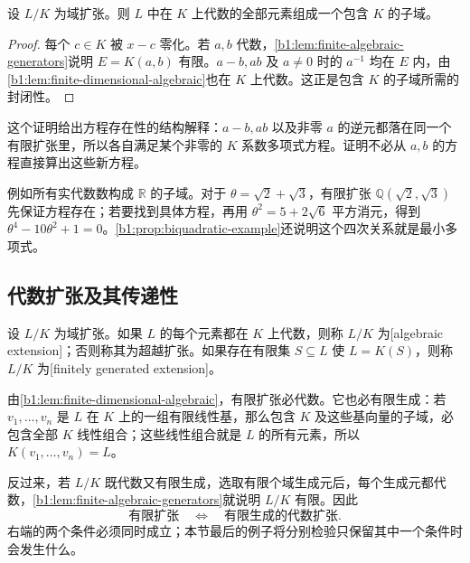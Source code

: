 \begin{proposition}\label{b1:prop:algebraic-elements-subfield}
	设 \(L/K\) 为域扩张。则 \(L\) 中在 \(K\) 上代数的全部元素组成一个包含 \(K\) 的子域。
\end{proposition}
\begin{proof}
	每个 \(c\in K\) 被 \(x-c\) 零化。若 \(a,b\) 代数，\cref{b1:lem:finite-algebraic-generators}说明 \(E=K(a,b)\) 有限。\(a-b,ab\) 及 \(a\neq0\) 时的 \(a^{-1}\) 均在 \(E\) 内，由\cref{b1:lem:finite-dimensional-algebraic}也在 \(K\) 上代数。这正是包含 \(K\) 的子域所需的封闭性。
\end{proof}
这个证明给出方程存在性的结构解释：\(a-b,ab\) 以及非零 \(a\) 的逆元都落在同一个有限扩张里，所以各自满足某个非零的 \(K\) 系数多项式方程。证明不必从 \(a,b\) 的方程直接算出这些新方程。

\ProseParagraphBreak
例如所有实代数数构成 \(\mathbb R\) 的子域。对于 \(\theta=\sqrt2+\sqrt3\)，有限扩张 \(\mathbb Q(\sqrt2,\sqrt3)\) 先保证方程存在；若要找到具体方程，再用 \(\theta^2=5+2\sqrt6\) 平方消元，得到 \(\theta^4-10\theta^2+1=0\)。\cref{b1:prop:biquadratic-example}还说明这个四次关系就是最小多项式。

\subsection{代数扩张及其传递性}
\label{b1:subsec:1402:02}

\begin{definition}\label{b1:def:algebraic-extension}
	设 \(L/K\) 为域扩张。如果 \(L\) 的每个元素都在 \(K\) 上代数，则称 \(L/K\) 为[algebraic extension]；否则称其为超越扩张。如果存在有限集 \(S\subseteq L\) 使 \(L=K(S)\)，则称 \(L/K\) 为[finitely generated extension]。
\end{definition}
由\cref{b1:lem:finite-dimensional-algebraic}，有限扩张必代数。它也必有限生成：若 \(v_1,\ldots,v_n\) 是 \(L\) 在 \(K\) 上的一组有限线性基，那么包含 \(K\) 及这些基向量的子域，必包含全部 \(K\) 线性组合；这些线性组合就是 \(L\) 的所有元素，所以 \(K(v_1,\ldots,v_n)=L\)。

\ProseParagraphBreak
反过来，若 \(L/K\) 既代数又有限生成，选取有限个域生成元后，每个生成元都代数，\cref{b1:lem:finite-algebraic-generators}就说明 \(L/K\) 有限。因此
\[
	\text{有限扩张} \quad\Longleftrightarrow\quad \text{有限生成的代数扩张}.
\]
右端的两个条件必须同时成立；本节最后的例子将分别检验只保留其中一个条件时会发生什么。

